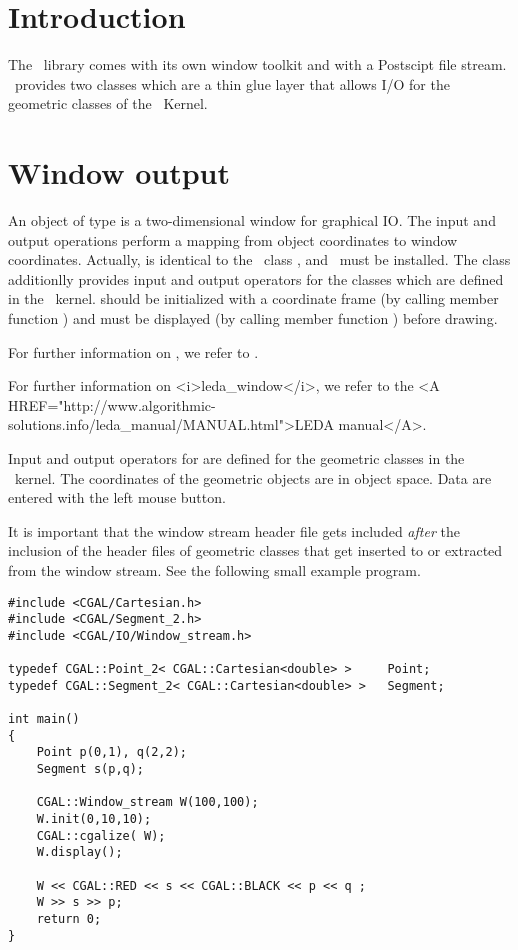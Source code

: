 \ccParDims

\section{Introduction}

The \leda\ library comes with its own window toolkit and with a
Postscipt file stream. \cgal\ provides two classes 
   
which  are a thin glue layer that allows I/O for the geometric 
classes of the \cgal\ Kernel.


\section{Window output}

An object of type  is a two-dimensional window for
graphical IO. The input and output operations perform a mapping from
object coordinates to window coordinates.
Actually,  is identical to the \leda\ class ,
and \leda\ must be installed. The class additionlly provides input and output 
operators for the classes which are defined in the \cgal\ kernel.
 should be initialized with a coordinate frame 
(by calling member function
) and must be displayed (by calling member function ) before
drawing.

\begin{ccTexOnly}
For further information on , we refer to \cite{cgal:mnsu-lum}.
\end{ccTexOnly}
\begin{ccHtmlOnly}
For further information on <i>leda_window</i>, we refer to the 
<A HREF="http://www.algorithmic-solutions.info/leda_manual/MANUAL.html">LEDA manual</A>.
\end{ccHtmlOnly}

Input and output operators for  are defined for 
the geometric classes in the \cgal\ kernel.
The coordinates of the geometric objects are in object space. Data are
entered with the left mouse button.

It is important that the window stream header file gets included
{\em after} the inclusion of the header files of geometric classes
that get inserted to or extracted from the window stream. See the following 
small example program.

\begin{verbatim}
#include <CGAL/Cartesian.h>
#include <CGAL/Segment_2.h>
#include <CGAL/IO/Window_stream.h>

typedef CGAL::Point_2< CGAL::Cartesian<double> >     Point;
typedef CGAL::Segment_2< CGAL::Cartesian<double> >   Segment;

int main()
{
    Point p(0,1), q(2,2);
    Segment s(p,q);

    CGAL::Window_stream W(100,100);
    W.init(0,10,10);
    CGAL::cgalize( W);
    W.display();

    W << CGAL::RED << s << CGAL::BLACK << p << q ;
    W >> s >> p;
    return 0;
}
\end{verbatim} 


